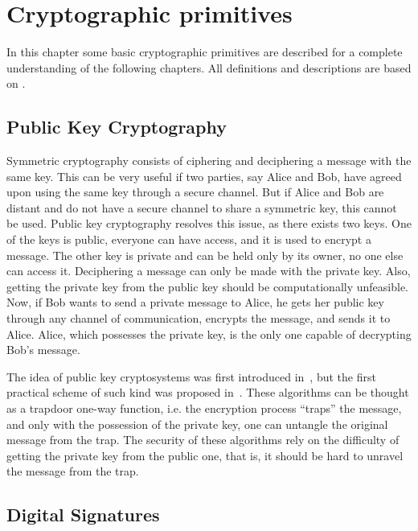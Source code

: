 \documentclass{ufsctex/ufsctex}
\begin{document}
\chapter{Cryptographic primitives}

In this chapter some basic cryptographic primitives are described for a
complete understanding of the following chapters. All definitions and
descriptions are based on \cite{stinson2005cryptography}.

\section{Public Key Cryptography}

Symmetric cryptography consists of ciphering and deciphering a message with the
same key. This can be very useful if two parties, say Alice and Bob, have
agreed upon using the same key through a secure channel. But if Alice and Bob
are distant and do not have a secure channel to share a symmetric key, this
cannot be used. Public key cryptography resolves this issue, as there exists
two keys.  One of the keys is public, everyone can have access, and it is used
to encrypt a message. The other key is private and can be held only by its
owner, no one else can access it. Deciphering a message can only be made with
the private key. Also, getting the private key from the public key should be
computationally unfeasible. Now, if Bob wants to send a private message to
Alice, he gets her public key through any channel of communication, encrypts
the message, and sends it to Alice. Alice, which possesses the private key, is
the only one capable of decrypting Bob's message.

The idea of public key cryptosystems was first introduced
in~\cite{diffie1976new}, but the first practical scheme of such kind was
proposed in~\cite{rivest1977digital}. These algorithms can be thought as a
trapdoor one-way function, i.e. the encryption process ``traps'' the message,
and only with the possession of the private key, one can untangle the original
message from the trap. The security of these algorithms rely on the difficulty
of getting the private key from the public one, that is, it should be hard to
unravel the message from the trap.

\section{Digital Signatures}
\end{document}
